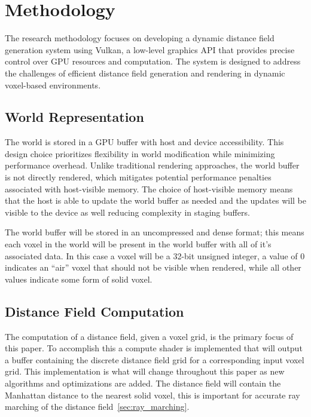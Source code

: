 \chapter{Methodology}
The research methodology focuses on developing a dynamic distance field generation system using Vulkan, a low-level
graphics API that provides precise control over GPU resources and computation. The system is designed to address the
challenges of efficient distance field generation and rendering in dynamic voxel-based environments.

\section{World Representation}
The world is stored in a GPU buffer with host and device accessibility. This design choice prioritizes flexibility in
world modification while minimizing performance overhead. Unlike traditional rendering approaches, the world buffer is
not directly rendered, which mitigates potential performance penalties associated with host-visible memory. The choice
of host-visible memory means that the host is able to update the world buffer as needed and the updates will be visible
to the device as well reducing complexity in staging buffers.

The world buffer will be stored in an uncompressed and dense format; this means each voxel in the world will be
present in the world buffer with all of it's associated data. In this case a voxel will be a 32-bit unsigned integer, a
value of 0 indicates an ``air'' voxel that should not be visible when rendered, while all other values indicate some
form of solid voxel.

\section{Distance Field Computation}
The computation of a distance field, given a voxel grid, is the primary focus of this paper. To accomplish this a
compute shader is implemented that will output a buffer containing the discrete distance field grid for a corresponding
input voxel grid. This implementation is what will change throughout this paper as new algorithms and optimizations are
added. The distance field will contain the Manhattan distance to the nearest solid voxel, this is important for accurate
ray marching of the distance field~\ref{sec:ray_marching}.

